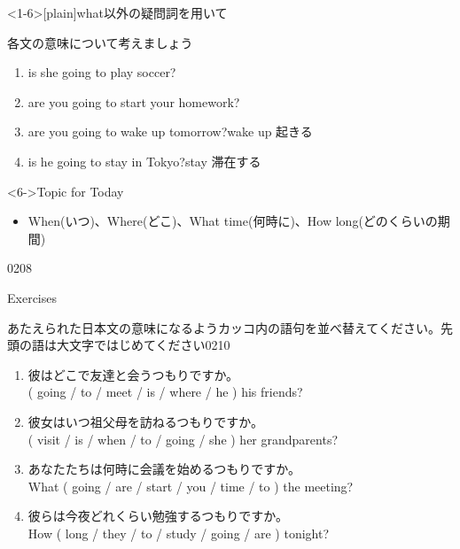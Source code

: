 \documentclass[aspectratio=169,xcolor={dvipsnames,table}]{beamer}
\newcommand{\liaison}{%
  \tikz[baseline=0pt] \draw (0,0) to[bend right=20] (0.2,0);%
}
\newcommand{\myaudio}[1]{\href{#1}{\faVolumeUp}}
\begin{document}
\begin{frame}<1-6>[plain]{what以外の疑問詞を用いて}

{\small 各文の意味について考えましょう}

\begin{enumerate}
 \item {} is she going to play soccer?
 \item {} are you going to start your homework?
 \item {} are you going to wake up tomorrow?\hfill{\scriptsize wake up \textipa{/w\'eIk\liaison \textturnv p/} 起きる}
 \item {} is he going to stay in Tokyo?\hfill{\scriptsize stay  滞在する}
\end{enumerate}

\begin{block}<6->{Topic for Today}
\small
\begin{itemize}[square]\small
 \item  When(いつ)、Where(どこ)、What time(何時に)、How long(どのくらいの期間)
\end{itemize}
      \end{block}
\hfill{\tiny 0208}\,{\scriptsize \myaudio{./audio/011_be_going_to_16.mp3}}
\end{frame}
\begin{frame}[plain]{Exercises}

{\small あたえられた日本文の意味になるようカッコ内の語句を並べ替えてください。先頭の語は大文字ではじめてください}\hfill{\tiny 0210}\,{\scriptsize \myaudio{./audio/011_be_going_to_17.mp3}}

 \begin{enumerate}
  \item {\small 彼はどこで友達と会うつもりですか。}\\
( going / to / meet / is / where / he ) his friends?\\
  \item {\small 彼女はいつ祖父母を訪ねるつもりですか。}\\
( visit / is / when / to / going / she ) her grandparents?\\
  \item {\small あなたたちは何時に会議を始めるつもりですか。}\\
What ( going / are / start / you / time / to ) the meeting?\\
  \item {\small 彼らは今夜どれくらい勉強するつもりですか。}\\
How ( long / they / to / study / going / are ) tonight?\\
 \end{enumerate}
\end{frame}
\end{document}
